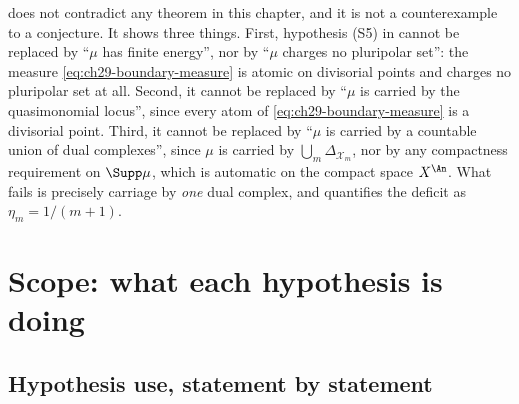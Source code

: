 \begin{remark}
\label{rem:ch29-boundary-scope}
 does not contradict any theorem in
this chapter, and it is not a counterexample to a conjecture.  It shows
three things.  First, hypothesis \textup{(S5)} in
 cannot be replaced by ``\(\mu\) has
finite energy'', nor by ``\(\mu\) charges no pluripolar set'': the measure
\eqref{eq:ch29-boundary-measure} is atomic on divisorial points and charges
no pluripolar set at all.  Second, it cannot be replaced by ``\(\mu\) is
carried by the quasimonomial locus'', since every atom of
\eqref{eq:ch29-boundary-measure} is a divisorial point.  Third, it cannot be
replaced by ``\(\mu\) is carried by a countable union of dual complexes'',
since \(\mu\) is carried by \(\bigcup_m\Delta_{\mathcal X_m}\), nor by any
compactness requirement on \(\Supp\mu\), which is automatic on the compact
space \(X^{\An}\).  What fails is precisely carriage by \emph{one} dual
complex, and  quantifies the deficit as
\(\eta_m=1/(m+1)\).
\end{remark}

\section{Scope: what each hypothesis is doing}
\label{sec:ch29-scope}

\subsection{Hypothesis use, statement by statement}
\label{sec:ch29-hypothesis-use}

